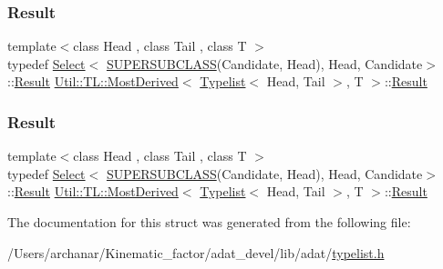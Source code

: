 \subsubsection{\texorpdfstring{Result}{Result}\hspace{0.1cm}{\footnotesize\ttfamily [1/2]}}
{\footnotesize\ttfamily template$<$class Head , class Tail , class T $>$ \\
typedef \mbox{\hyperlink{structUtil_1_1Select}{Select}}$<$ \mbox{\hyperlink{install_2include_2adat_2typemanip_8h_a2820bb39352560126da663542139bd9b}{S\+U\+P\+E\+R\+S\+U\+B\+C\+L\+A\+SS}}(Candidate, Head), Head, Candidate$>$\+::\mbox{\hyperlink{structUtil_1_1TL_1_1MostDerived_3_01Typelist_3_01Head_00_01Tail_01_4_00_01T_01_4_a70c1999c1e1c8426f47682c8a0289724}{Result}} \mbox{\hyperlink{structUtil_1_1TL_1_1MostDerived}{Util\+::\+T\+L\+::\+Most\+Derived}}$<$ \mbox{\hyperlink{structUtil_1_1Typelist}{Typelist}}$<$ Head, Tail $>$, T $>$\+::\mbox{\hyperlink{structUtil_1_1TL_1_1MostDerived_3_01Typelist_3_01Head_00_01Tail_01_4_00_01T_01_4_a70c1999c1e1c8426f47682c8a0289724}{Result}}}

\mbox{\label{structUtil_1_1TL_1_1MostDerived_3_01Typelist_3_01Head_00_01Tail_01_4_00_01T_01_4_a70c1999c1e1c8426f47682c8a0289724}} 
\subsubsection{\texorpdfstring{Result}{Result}\hspace{0.1cm}{\footnotesize\ttfamily [2/2]}}
{\footnotesize\ttfamily template$<$class Head , class Tail , class T $>$ \\
typedef \mbox{\hyperlink{structUtil_1_1Select}{Select}}$<$ \mbox{\hyperlink{install_2include_2adat_2typemanip_8h_a2820bb39352560126da663542139bd9b}{S\+U\+P\+E\+R\+S\+U\+B\+C\+L\+A\+SS}}(Candidate, Head), Head, Candidate$>$\+::\mbox{\hyperlink{structUtil_1_1TL_1_1MostDerived_3_01Typelist_3_01Head_00_01Tail_01_4_00_01T_01_4_a70c1999c1e1c8426f47682c8a0289724}{Result}} \mbox{\hyperlink{structUtil_1_1TL_1_1MostDerived}{Util\+::\+T\+L\+::\+Most\+Derived}}$<$ \mbox{\hyperlink{structUtil_1_1Typelist}{Typelist}}$<$ Head, Tail $>$, T $>$\+::\mbox{\hyperlink{structUtil_1_1TL_1_1MostDerived_3_01Typelist_3_01Head_00_01Tail_01_4_00_01T_01_4_a70c1999c1e1c8426f47682c8a0289724}{Result}}}



The documentation for this struct was generated from the following file\+:\begin{DoxyCompactItemize}
\item 
/\+Users/archanar/\+Kinematic\+\_\+factor/adat\+\_\+devel/lib/adat/\mbox{\hyperlink{lib_2adat_2typelist_8h}{typelist.\+h}}\end{DoxyCompactItemize}
